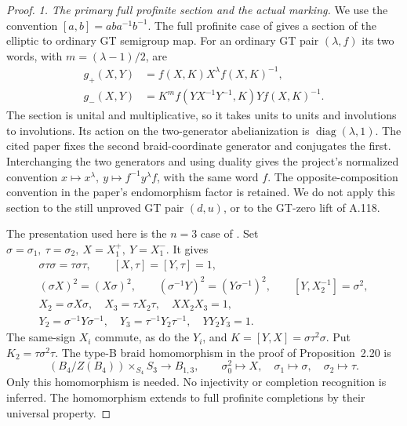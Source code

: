 \begin{proof}
\emph{1. The primary full profinite section and the actual marking.}
We use the convention \([a,b]=aba^{-1}b^{-1}\).
The full profinite case of
\citet[Proposition~2.20]{A_Enriquez2014} gives a section of the elliptic
to ordinary GT semigroup map. For an ordinary GT pair \((\lambda,f)\)
its two words, with \(m=(\lambda-1)/2\), are
\[
 \begin{aligned}
 g_+(X,Y)&=f(X,K)X^\lambda f(X,K)^{-1},\\
 g_-(X,Y)&=K^m f(YX^{-1}Y^{-1},K)Yf(X,K)^{-1}.
 \end{aligned}                                                \tag{A.121.2}
\]
The section is unital and multiplicative, so it takes units to units
and involutions to involutions. Its action on the two-generator
abelianization is \(\operatorname{diag}(\lambda,1)\).
The cited paper fixes the second braid-coordinate generator and
conjugates the first. Interchanging the two generators and using
duality gives the project's normalized convention
\(x\mapsto x^\lambda,\ y\mapsto f^{-1}y^\lambda f\), with the
same word \(f\). The opposite-composition convention in the paper's
endomorphism factor is retained. We do not apply this section to
the still unproved GT pair \((d,u)\), or to the GT-zero lift of A.118.

The presentation used here is the \(n=3\) case of
\citet[Section~1.2, equation~(7)]{A_Enriquez2014}. Set
\(\sigma=\sigma_1,\ \tau=\sigma_2,\ X=X_1^+,\ Y=X_1^-\).
It gives
\[
 \begin{gathered}
 \sigma\tau\sigma=\tau\sigma\tau,\qquad
 [X,\tau]=[Y,\tau]=1,\\
 (\sigma X)^2=(X\sigma)^2,\qquad
 (\sigma^{-1}Y)^2=(Y\sigma^{-1})^2,\qquad
 [Y,X_2^{-1}]=\sigma^2,\\
 X_2=\sigma X\sigma,\quad X_3=\tau X_2\tau,\quad XX_2X_3=1,\\
 Y_2=\sigma^{-1}Y\sigma^{-1},\quad
 Y_3=\tau^{-1}Y_2\tau^{-1},\quad YY_2Y_3=1 .
 \end{gathered}                                                \tag{A.121.3}
\]
The same-sign \(X_i\) commute, as do the \(Y_i\), and
\(K=[Y,X]=\sigma\tau^2\sigma\). Put \(K_2=\tau\sigma^2\tau\).
The type-B braid homomorphism in the proof of Proposition~2.20 is
\[
 (B_4/Z(B_4))\times_{S_4}S_3\longrightarrow B_{1,3},\qquad
 \sigma_0^2\longmapsto X,\quad
 \sigma_1\longmapsto\sigma,\quad\sigma_2\longmapsto\tau.          \tag{A.121.4}
\]
Only this homomorphism is needed. No injectivity or completion
recognition is inferred. The homomorphism extends to full profinite
completions by their universal property.


\end{proof}
